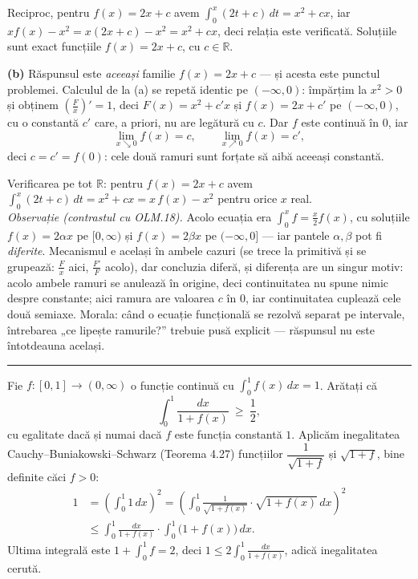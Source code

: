 Reciproc, pentru $f(x)=2x+c$ avem $\int_0^x(2t+c)\,dt = x^2+cx$, iar
$x f(x)-x^2 = x(2x+c)-x^2 = x^2+cx$, deci relația este verificată. Soluțiile sunt
exact funcțiile $f(x)=2x+c$, cu $c\in\mathbb{R}$.

\noindent\textbf{(b)} Răspunsul este \emph{aceeași} familie $f(x)=2x+c$ --- și
acesta este punctul problemei. Calculul de la (a) se repetă identic pe
$(-\infty,0)$: împărțim la $x^2>0$ și obținem $\left(\frac Fx\right)'=1$, deci
$F(x)=x^2+c'x$ și $f(x)=2x+c'$ pe $(-\infty,0)$, cu o constantă $c'$ care, a
priori, nu are legătură cu $c$. Dar $f$ este continuă în $0$, iar
\[ \lim_{x\searrow0}f(x)=c,\qquad \lim_{x\nearrow0}f(x)=c' , \]
deci $c=c'=f(0)$: cele două ramuri sunt forțate să aibă aceeași constantă.

\noindent Verificarea pe tot $\mathbb{R}$: pentru $f(x)=2x+c$ avem
$\int_0^x(2t+c)\,dt=x^2+cx=x\,f(x)-x^2$ pentru orice $x$ real.\\[2pt]
\emph{Observație (contrastul cu OLM.18).} Acolo ecuația era
$\int_0^x f=\frac x2 f(x)$, cu soluțiile $f(x)=2\alpha x$ pe $[0,\infty)$ și
$f(x)=2\beta x$ pe $(-\infty,0]$ --- iar pantele $\alpha,\beta$ pot fi
\emph{diferite}. Mecanismul e același în ambele cazuri (se trece la primitivă și
se grupează: $\frac Fx$ aici, $\frac{F'}{F}$ acolo), dar concluzia diferă, și
diferența are un singur motiv: acolo ambele ramuri se anulează în origine, deci
continuitatea nu spune nimic despre constante; aici ramura are valoarea $c$ în $0$,
iar continuitatea cuplează cele două semiaxe. Morala: când o ecuație funcțională se
rezolvă separat pe intervale, întrebarea „ce lipește ramurile?'' trebuie pusă
explicit --- răspunsul nu este întotdeauna același.
\vspace{1mm}\hrule

Fie $f:[0,1]\to(0,\infty)$ o funcție continuă cu $\displaystyle\int_0^1 f(x)\,dx = 1$.
Arătați că
\[ \int_0^1 \frac{dx}{1+f(x)} \ \ge\ \frac12, \]
cu egalitate dacă și numai dacă $f$ este funcția constantă $1$.
\sol Aplicăm inegalitatea Cauchy--Buniakowski--Schwarz (Teorema 4.27) funcțiilor
$\dfrac{1}{\sqrt{1+f}}$ și $\sqrt{1+f}$, bine definite căci $f>0$:
\[ \begin{aligned} 1 &= \left(\int_0^1 1\,dx\right)^{\!2}
= \left(\int_0^1 \frac{1}{\sqrt{1+f(x)}}\cdot\sqrt{1+f(x)}\,dx\right)^{\!2}\\
&\le \int_0^1\frac{dx}{1+f(x)}\cdot\int_0^1\bigl(1+f(x)\bigr)\,dx . \end{aligned} \]
Ultima integrală este $1+\int_0^1 f = 2$, deci
$1 \le 2\int_0^1\frac{dx}{1+f(x)}$, adică inegalitatea cerută.

